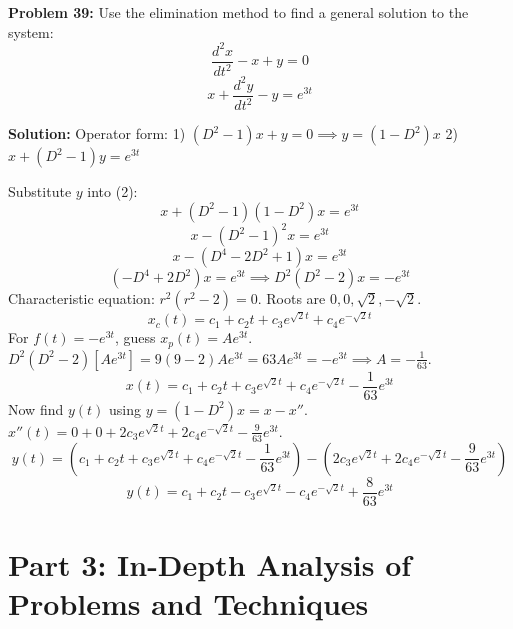 \documentclass[11pt]{article}
\begin{document}
\vspace{0.5cm}
\textbf{Problem 39:} Use the elimination method to find a general solution to the system:
\[ \frac{d^2 x}{dt^2} - x + y = 0 \]
\[ x + \frac{d^2 y}{dt^2} - y = e^{3t} \]

\textbf{Solution:}
Operator form:
1) $(D^2 - 1)x + y = 0 \implies y = (1 - D^2)x$
2) $x + (D^2 - 1)y = e^{3t}$

Substitute $y$ into (2):
\[ x + (D^2 - 1)(1 - D^2)x = e^{3t} \]
\[ x - (D^2 - 1)^2 x = e^{3t} \]
\[ x - (D^4 - 2D^2 + 1)x = e^{3t} \]
\[ (-D^4 + 2D^2)x = e^{3t} \implies D^2(D^2 - 2)x = -e^{3t} \]
Characteristic equation: $r^2(r^2 - 2) = 0$. Roots are $0, 0, \sqrt{2}, -\sqrt{2}$.
\[ x_c(t) = c_1 + c_2 t + c_3 e^{\sqrt{2}t} + c_4 e^{-\sqrt{2}t} \]
For $f(t) = -e^{3t}$, guess $x_p(t) = A e^{3t}$.
$D^2(D^2 - 2) [A e^{3t}] = 9(9 - 2) A e^{3t} = 63 A e^{3t} = -e^{3t} \implies A = -\frac{1}{63}$.
\[ x(t) = c_1 + c_2 t + c_3 e^{\sqrt{2}t} + c_4 e^{-\sqrt{2}t} - \frac{1}{63} e^{3t} \]
Now find $y(t)$ using $y = (1 - D^2)x = x - x''$.
$x''(t) = 0 + 0 + 2c_3 e^{\sqrt{2}t} + 2c_4 e^{-\sqrt{2}t} - \frac{9}{63} e^{3t}$.
\[ y(t) = \left( c_1 + c_2 t + c_3 e^{\sqrt{2}t} + c_4 e^{-\sqrt{2}t} - \frac{1}{63} e^{3t} \right) - \left( 2c_3 e^{\sqrt{2}t} + 2c_4 e^{-\sqrt{2}t} - \frac{9}{63} e^{3t} \right) \]
\[ y(t) = c_1 + c_2 t - c_3 e^{\sqrt{2}t} - c_4 e^{-\sqrt{2}t} + \frac{8}{63} e^{3t} \]

\newpage
\section{Part 3: In-Depth Analysis of Problems and Techniques}
\end{document}
